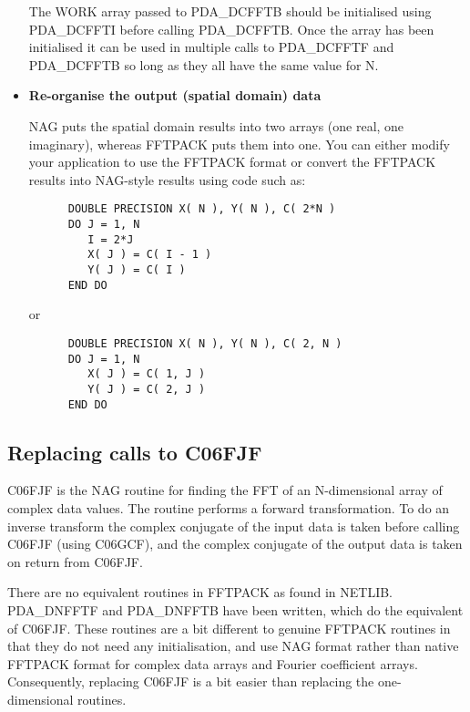 \begin{itemize}
   The WORK array passed to PDA\_DCFFTB should be initialised using
   PDA\_DCFFTI before calling PDA\_DCFFTB. Once the array has been
   initialised it can be used in multiple calls to PDA\_DCFFTF and
   PDA\_DCFFTB so long as they all have the same value for N.

\item{\bf Re-organise the output (spatial domain) data}

   NAG puts the spatial domain results into two arrays (one real, one
   imaginary), whereas FFTPACK puts them into one. You can either
   modify your application to use the FFTPACK format or convert the
   FFTPACK results into NAG-style results using code such as:

\begin{verbatim}
      DOUBLE PRECISION X( N ), Y( N ), C( 2*N )
      DO J = 1, N
         I = 2*J
         X( J ) = C( I - 1 )
         Y( J ) = C( I )
      END DO
\end{verbatim}

   or

\begin{verbatim}
      DOUBLE PRECISION X( N ), Y( N ), C( 2, N )
      DO J = 1, N
         X( J ) = C( 1, J )
         Y( J ) = C( 2, J )
      END DO
\end{verbatim}

\end{itemize}


\subsection{\label{m_c06fjf}Replacing calls to C06FJF}

   C06FJF is the NAG routine for finding the FFT of an N-dimensional
   array of complex data values. The routine performs a forward
   transformation. To do an inverse transform the complex conjugate of
   the input data is taken before calling C06FJF (using C06GCF), and the
   complex conjugate of the output data is taken on return from C06FJF.

   There are no equivalent routines in FFTPACK as found in NETLIB.
   PDA\_DNFFTF and PDA\_DNFFTB have been written, which do the equivalent of
   C06FJF. These routines are a bit different to genuine FFTPACK
   routines in that they do not need any initialisation, and use NAG
   format rather than native FFTPACK format for complex data arrays and
   Fourier coefficient arrays. Consequently, replacing C06FJF is a bit
   easier than replacing the one-dimensional routines.

